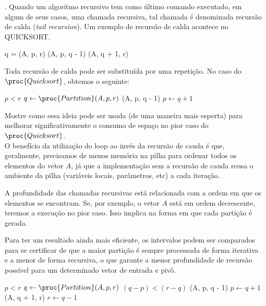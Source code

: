 
. Quando um algoritmo recursivo tem como último comando executado, em algum de seus casos, uma chamada recursiva, tal chamada é denominada recursão de calda (\textit{tail recursion}). Um exemplo de recursão de calda acontece no QUICKSORT.
\begin{codebox}
\li     q = (A, p, r)
\li     {}(A, p, q - 1)
\li     {}(A, q + 1, r)
\End
\end{codebox}

Toda recursão de calda pode ser substituída por uma repetição. No caso do $\proc{Quicksort}$, obtemos o seguinte:
\begin{codebox}
\li     \While $p < r$
\li         \Do
                $q \gets \proc{Partition}(A, p, r)$
\li             {}(A, p, q - 1)
\li             $p \gets q + 1$
            \End
\end{codebox}

Mostre como essa ideia pode ser usada (de uma maneira mais esperta) para melhorar significativamente o consumo de espaço no pior caso do $\proc{Quicksort}$.\\[6pt]
O benefício da utilização do loop ao invés da recursão de cauda é que, geralmente, precisamos de menos memória na pilha para ordenar todos os elementos do vetor $A$, já que a implementação sem a recursão de cauda reusa o ambiente da pilha (variáveis locais, parâmetros, etc) a cada iteração.

A profundidade das chamadas recursivas está relacionada com a ordem em que os elementos se encontram. Se, por exemplo, o vetor $A$ está em ordem decrescente, teremos a execução no pior caso. Isso implica na forma em que cada partição é gerada.

Para ter um resultado ainda mais eficiente, os intervalos podem ser comparados para se certificar de que a maior partição é sempre processada de forma iterativa e a menor de forma recursiva, o que garante a menor profundidade de recursão possível para um determinado vetor de entrada e pivô.
\begin{codebox}
\li     \While $p < r$
\li         \Do
                $q \gets \proc{Partition}(A, p, r)$
\li             \If $(q - p) < (r - q)$
\li                 \Then
                    (A, p, q - 1)
\li                 $p \gets q + 1$
\li                 \Else
\li                 {}(A, q + 1, r)
\li                 $r \gets q - 1$
                \End
            \End
\end{codebox}
